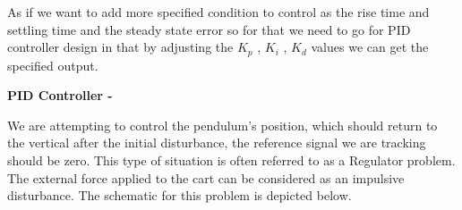 \documentclass[11pt]{article}
\begin{document}
As if we want to add more specified condition to control as the rise time and settling time and the steady state error so for that we need to go for PID controller design in that by adjusting the $K_p$ , $K_i$ , $K_d$ values we can get the specified output.\\

\newpage










{\large \textbf{ PID Controller - \\}}

{We are attempting to control the pendulum's position, which should return to the vertical after the initial disturbance, the reference signal we are tracking should be zero. This type of situation is often referred to as a Regulator problem. The external force applied to the cart can be considered as an impulsive disturbance. The schematic for this problem is depicted below.}
\end{document}
